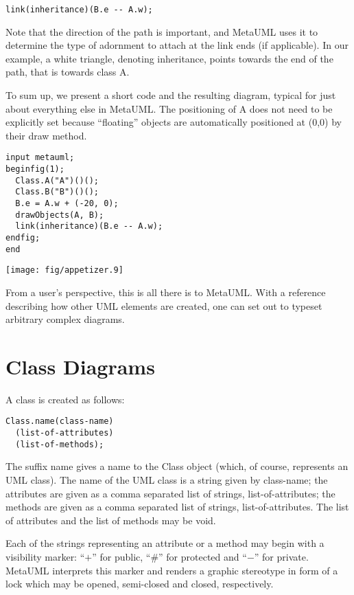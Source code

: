 \documentclass{article}
\newcommand{\code}{\ttfamily}
\begin{document}
\begin{verbatim}
link(inheritance)(B.e -- A.w);
\end{verbatim}

Note that the direction of the path is important, and MetaUML uses it to determine the
type of adornment to attach at the link ends (if applicable). In our example, a white triangle,
denoting inheritance, points towards the end of the path, that is towards class {\code A}.

To sum up, we present a short code and the resulting diagram, typical for just about
everything else in MetaUML. The positioning of {\code A} does not need to be
explicitly set because ``floating'' objects are automatically positioned at {\code (0,0)} by their
draw method.

\begin{multicols}{2}

\begin{verbatim}
input metauml;
beginfig(1);
  Class.A("A")()();
  Class.B("B")()();
  B.e = A.w + (-20, 0);
  drawObjects(A, B);
  link(inheritance)(B.e -- A.w);
endfig;
end
\end{verbatim}
\columnbreak
\texttt{[image: fig/appetizer.9]}
\end{multicols}

From a user's perspective, this is all there is to MetaUML. With a reference describing how other
UML elements are created, one can set out to typeset arbitrary complex diagrams.

\section{Class Diagrams}

A class is created as follows:

\begin{verbatim}
Class.name(class-name)
  (list-of-attributes)
  (list-of-methods);
\end{verbatim}

The suffix {\code name} gives a name to the {\code Class} object (which, of course, represents an UML class).
The name of the UML class is a string given by {\code class-name};
the attributes are given as a comma separated list of strings, {\code list-of-attributes};
the methods are given as a comma separated list of strings, {\code list-of-attributes}.
The list of attributes and the list of methods may be void.

Each of the strings representing an attribute or a method may begin with a visibility marker: ``$+$'' for
public, ``\#'' for protected and ``$-$'' for private. MetaUML interprets this marker and renders a
graphic stereotype in form of a lock which may be opened, semi-closed and closed, respectively.
\end{document}
